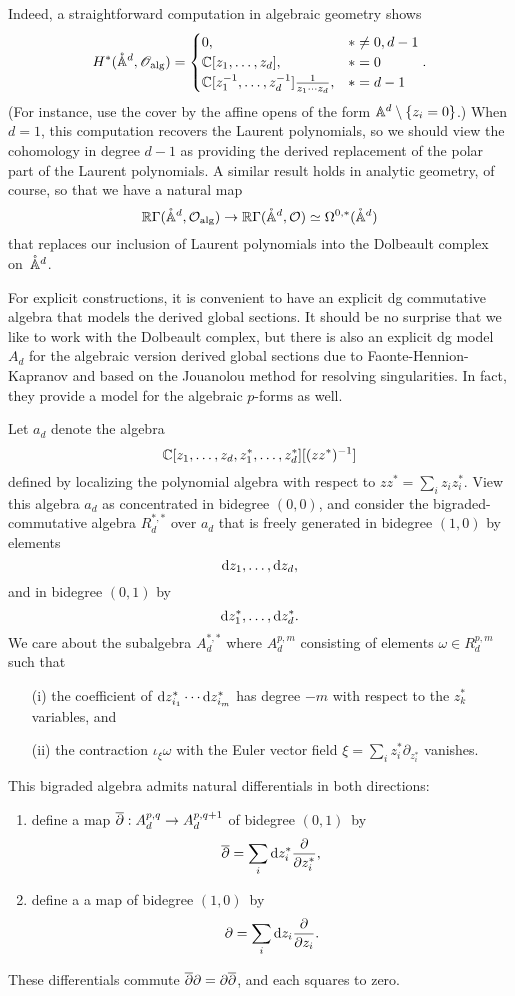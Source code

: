 Indeed, a straightforward computation in algebraic geometry shows
\[
H^*(\pAA^{d}, \sO_{\rm alg}) = 
\begin{cases} 
0, & * \neq 0, d-1 \\ 
\CC[z_1,\ldots,z_d], & * = 0 \\ \CC[z_1^{-1},\ldots,z_d^{-1}] \frac{1}{z_1 \cdots z_d}, & * = d-1 
\end{cases}.
\]
(For instance, use the cover by the affine opens of the form $\AA^d \setminus \{z_i =0\}$.)
When $d=1$, this computation recovers the Laurent polynomials,
so we should view the cohomology in degree $d-1$ as providing the derived replacement of the polar part of the Laurent polynomials.
A similar result holds in analytic geometry, of course,
so that we have a natural map
\[
\RR \Gamma(\pAA^d, \cO_{\rm alg}) \to \RR \Gamma(\pAA^d, \cO) \simeq \Omega^{0,*}(\pAA^d)
\]
that replaces our inclusion of Laurent polynomials into the Dolbeault complex on~$\pAA^d$.

For explicit constructions, it is convenient to have an explicit dg commutative algebra that models the derived global sections.
It should be no surprise that we like to work with the Dolbeault complex,
but there is also an explicit dg model $A_d$ for the algebraic version derived global sections due to Faonte-Hennion-Kapranov \cite{FHK} and based on the Jouanolou method for resolving singularities. 
In fact, they provide a model for the algebraic $p$-forms as well.

\begin{dfn}
Let $a_d$ denote the algebra  
\[
\CC[z_1,\ldots,z_d, z_1^*,\ldots,z_d^*][(z z^*)^{-1}]
\]
defined by localizing the polynomial algebra with respect to $zz^* = \sum_i z_i z^*_i$.
View this algebra $a_d$ as concentrated in bidegree $(0,0)$, 
and consider the bigraded-commutative algebra $R^{*,*}_d$ over $a_d$ that is freely generated in bidegree $(1,0)$ by elements
\[
\d z_1,\ldots , \d z_d,
\] 
and in bidegree $(0,1)$ by
\[
\d z_1^*,\ldots, \d z_d^*.
\]
We care about the subalgebra $A^{*,*}_d$ where $A^{p,m}_d$ consisting of elements $\omega \in R^{p,m}_d$ such that
\begin{itemize}
\item[(i)] the coefficient of $\d z^*_{i_1} \cdots \d z^*_{i_m}$ has degree $-m$ with respect to the $z_k^*$ variables, and
\item[(ii)] the contraction $\iota_\xi \omega$ with the Euler vector field $\xi = \sum_{i} z_i^* \partial_{z_{i}^*}$ vanishes.
\end{itemize}
This bigraded algebra admits natural differentials in both directions:
\begin{enumerate}
\item define a map $\dbar : A_d^{p,q} \to A_d^{p,q+1}$ of bidegree $(0,1)$~by
\[
\dbar = \sum_i \d z^*_i \frac{\partial}{\partial z_i^*},
\]
\item define a a map of bidegree $(1,0)$~by
\[
\partial = \sum_i \d z_i \frac{\partial}{\partial z_i} .
\]
\end{enumerate}
These differentials commute $\dbar \partial = \partial \dbar$,
and each squares to zero.
\end{dfn}

